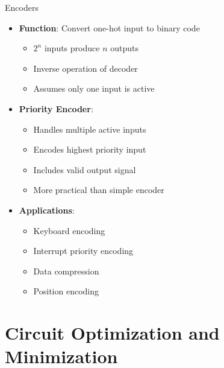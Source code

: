 \documentclass[aspectratio=169,11pt]{beamer}
\newcommand{\concept}[1]{\textbf{\color{accentcolor}#1}}
\begin{document}
\begin{frame}{Encoders}
\begin{itemize}
\item \concept{Function}: Convert one-hot input to binary code
\begin{itemize}
\item $2^n$ inputs produce $n$ outputs
\item Inverse operation of decoder
\item Assumes only one input is active
\end{itemize}
\vspace{0.5cm}
\item \concept{Priority Encoder}:
\begin{itemize}
\item Handles multiple active inputs
\item Encodes highest priority input
\item Includes valid output signal
\item More practical than simple encoder
\end{itemize}
\vspace{0.3cm}
\item \concept{Applications}:
\begin{itemize}
\item Keyboard encoding
\item Interrupt priority encoding
\item Data compression
\item Position encoding
\end{itemize}
\end{itemize}
\end{frame}

\section{Circuit Optimization and Minimization}
\end{document}
